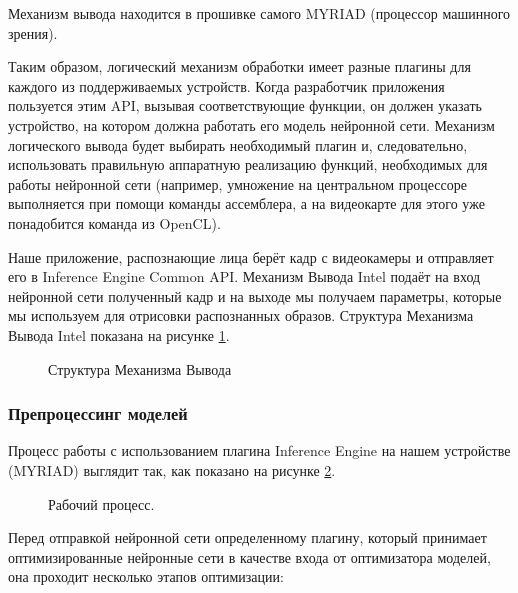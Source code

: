 \documentclass[14pt,a4paper]{scrartcl}
\begin{document}
			Механизм вывода находится в прошивке самого MYRIAD (процессор машинного зрения).
			
			Таким образом, логический механизм обработки имеет разные плагины для каждого из поддерживаемых устройств. Когда разработчик приложения пользуется этим API, вызывая соответствующие функции, он должен указать устройство, на котором должна работать его модель нейронной сети.	Механизм логического вывода будет выбирать необходимый плагин и, следовательно, использовать правильную аппаратную реализацию функций, необходимых для работы нейронной сети (например, умножение на центральном процессоре выполняется при помощи команды ассемблера, а на видеокарте для этого уже понадобится команда из OpenCL).
			
			Наше приложение, распознающие лица берёт кадр с видеокамеры и отправляет его в Inference Engine Common API. Механизм Вывода Intel подаёт на вход нейронной сети полученный кадр и на выходе мы получаем параметры, которые мы используем для отрисовки распознанных образов. Структура Механизма Вывода Intel показана на рисунке \ref{fig:Inference_Engine}\cite{bib:Intel_CV_School}.
			
			\begin{figure}[h]
				\caption{Структура Механизма Вывода}
				\label{fig:Inference_Engine}
			\end{figure}
		
		\subsubsection{Препроцессинг моделей}
		
			Процесс работы с использованием плагина Inference Engine на нашем устройстве (MYRIAD) выглядит так, как показано на рисунке \ref{fig:End_To_End_Workflow}.
			
			\begin{figure}[h]
				\caption{Рабочий процесс.}
				\label{fig:End_To_End_Workflow}
			\end{figure}
			
			Перед отправкой нейронной сети определенному плагину, который принимает оптимизированные нейронные сети в качестве входа от оптимизатора моделей, она проходит несколько этапов оптимизации:
			
\end{document}
